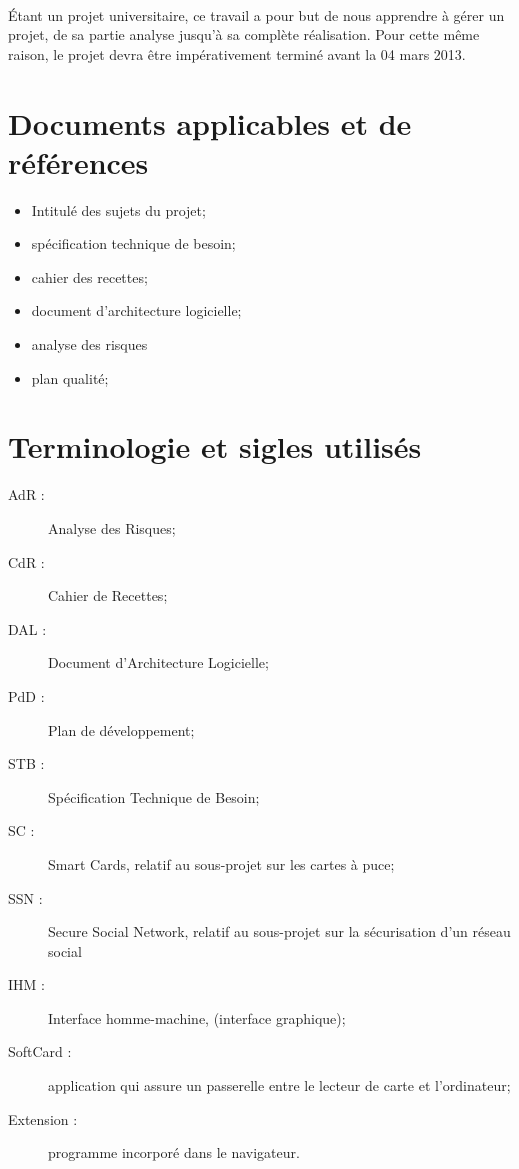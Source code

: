 \documentclass[a4paper,11pt,french]{article}
\begin{document}
\paragraph{}
Étant un projet universitaire, ce travail a pour but de nous apprendre
à gérer un projet, de sa partie analyse jusqu'à sa complète réalisation. Pour
cette même raison, le projet devra être impérativement terminé avant la 04 
mars 2013.

\section{Documents applicables et de références}
\begin{itemize}
 \item Intitulé des sujets du projet;
 \item spécification technique de besoin;
 \item cahier des recettes;
 \item document d'architecture logicielle;
 \item analyse des risques
 \item plan qualité;
\end{itemize}

\section{Terminologie et sigles utilisés}
\begin{description}
	\item[AdR :] Analyse des Risques;
	\item[CdR :] Cahier de Recettes;
	\item[DAL :] Document d'Architecture Logicielle;
	\item[PdD :] Plan de développement;
	\item[STB :] Spécification Technique de Besoin;
	\item[SC :] Smart Cards, relatif au sous-projet sur
    les cartes à puce;
	\item[SSN :] Secure Social Network, relatif au sous-projet
    sur la sécurisation d'un réseau social
	\item[IHM :] Interface homme-machine, (interface graphique);
	\item[SoftCard :] application qui assure un passerelle entre
    le lecteur de carte et l'ordinateur;
    \item[Extension :] programme incorporé dans le navigateur.
\end{description}
\end{document}
